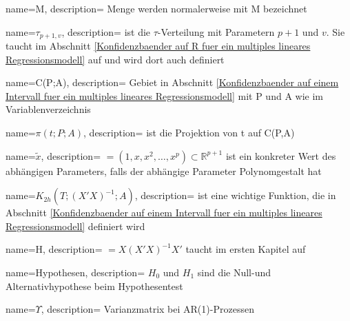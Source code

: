 
{
    name=M,
    description={ Menge werden normalerweise mit M bezeichnet}
} 

{
    name=$\tau_{p+1,v}$,
    description={ ist die $\tau$-Verteilung mit Parametern $p+1$ und $v$. Sie taucht im Abschnitt \ref{Konfidenzbaender auf R fuer ein multiples lineares Regressionsmodell} auf und wird dort auch definiert}
} 

{
    name=C(P;A),
    description={ Gebiet in Abschnitt \ref{Konfidenzbaender auf einem Intervall fuer ein multiples lineares Regressionsmodell} mit P und A wie im Variablenverzeichnis}
}

{
    name=$\pi(t;P;A)$,
    description={ ist die Projektion von t auf C(P,A)}
}

{
    name=$\tilde{x}$,
    description={ $=(1, x, x^2, \ldots, x^p) \subset \mathbb{R}^{p+1}$ ist ein konkreter Wert des abhängigen Parameters, falls der abhängige Parameter Polynomgestalt hat}
}

{
    name=$K_{2h}(T;(X'X)^{-1};A)$,
    description={ ist eine wichtige Funktion, die in Abschnitt \ref{Konfidenzbaender auf einem Intervall fuer ein multiples lineares Regressionsmodell} definiert wird}
}

{
    name=H,
    description={ $=X(X'X)^{-1}X'$ taucht im ersten Kapitel auf}
}  

{
    name=Hypothesen,
    description={ $H_0$ und $H_1$ sind die Null-und Alternativhypothese beim Hypothesentest}
}

{
    name=$\Upsilon$,
    description={ Varianzmatrix bei AR(1)-Prozessen}
}



